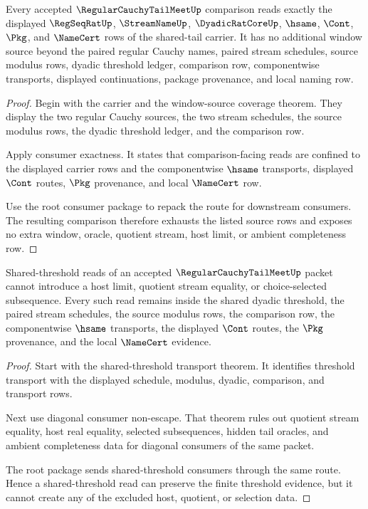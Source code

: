 \begin{theorem}
\label{thm:regular-cauchy-tail-meet-window-source-exhaustion}
Every accepted $\RegularCauchyTailMeetUp$ comparison reads exactly the displayed $\RegSeqRatUp$, $\StreamNameUp$, $\DyadicRatCoreUp$, $\hsame$, $\Cont$, $\Pkg$, and $\NameCert$ rows of the shared-tail carrier. It has no additional window source beyond the paired regular Cauchy names, paired stream schedules, source modulus rows, dyadic threshold ledger, comparison row, componentwise transports, displayed continuations, package provenance, and local naming row.
\end{theorem}
\begin{proof}
Begin with the carrier and the window-source coverage theorem. They display the two regular Cauchy sources, the two stream schedules, the source modulus rows, the dyadic threshold ledger, and the comparison row.

Apply consumer exactness. It states that comparison-facing reads are confined to the displayed carrier rows and the componentwise $\hsame$ transports, displayed $\Cont$ routes, $\Pkg$ provenance, and local $\NameCert$ row.

Use the root consumer package to repack the route for downstream consumers. The resulting comparison therefore exhausts the listed source rows and exposes no extra window, oracle, quotient stream, host limit, or ambient completeness row.
\end{proof}

\begin{theorem}
\label{thm:regular-cauchy-tail-meet-shared-threshold-nonescape}
Shared-threshold reads of an accepted $\RegularCauchyTailMeetUp$ packet cannot introduce a host limit, quotient stream equality, or choice-selected subsequence. Every such read remains inside the shared dyadic threshold, the paired stream schedules, the source modulus rows, the comparison row, the componentwise $\hsame$ transports, the displayed $\Cont$ routes, the $\Pkg$ provenance, and the local $\NameCert$ evidence.
\end{theorem}
\begin{proof}
Start with the shared-threshold transport theorem. It identifies threshold transport with the displayed schedule, modulus, dyadic, comparison, and transport rows.

Next use diagonal consumer non-escape. That theorem rules out quotient stream equality, host real equality, selected subsequences, hidden tail oracles, and ambient completeness data for diagonal consumers of the same packet.

The root package sends shared-threshold consumers through the same route. Hence a shared-threshold read can preserve the finite threshold evidence, but it cannot create any of the excluded host, quotient, or selection data.
\end{proof}

